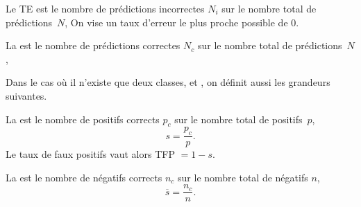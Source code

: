 \documentclass[12pt,fancy]{cours}
\begin{document}
\begin{liste}
\item Le  TE est le nombre de prédictions incorrectes $N_i$ sur le nombre total de prédictions~$N$,
On vise un taux d’erreur le plus proche possible de $0$.
\item La  est le nombre de prédictions correctes $N_c$ sur le nombre total de prédictions~$N$,
\end{liste}
\begin{remarque}
    
    Dans le cas où il n’existe que deux classes,  et , on définit aussi les grandeurs suivantes.
    \begin{liste}
\item La  est le nombre de positifs corrects $p_c$  sur le nombre total de positifs~$p$,
\begin{equation}
    s = \frac{p_c}{p}.
\end{equation}
Le taux de faux positifs vaut alors TFP $= 1-s$.
\item La  est le nombre de négatifs corrects $n_c$  sur le nombre total de négatifs $n$,
\begin{equation}
    \overline{s} = \frac{n_c}{n}.
\end{equation}

\end{liste}
\end{remarque}
\end{document}
